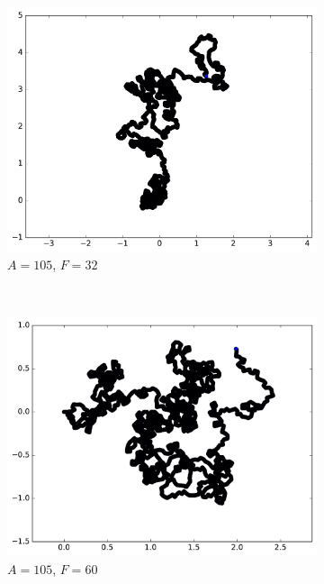 \begin{figure}[htb]
\begin{subfigure}[t]{\subImgWmo}
			\centering
			\includegraphics[width=\textwidth]{figures/ch3/synTraj_219_105_32}
			\caption[$A = 105$, $F=32$]{$A = 105$, $F=32$}
			\label{fig:synTraj_219_105_32}
		\end{subfigure}
		~
		\begin{subfigure}[t]{\subImgWmo}
			\centering
			\includegraphics[width=\textwidth]{figures/ch3/synTraj_219_105_60}
			\caption[$A = 105$, $F=60$]{$A = 105$, $F=60$}
			\label{fig:synTraj_219_105_60}
		\end{subfigure}
		~
		\begin{subfigure}[t]{\subImgWmo}
			\centering

\end{subfigure}
\end{figure}
